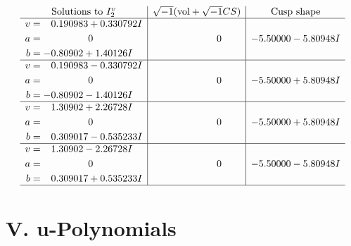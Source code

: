\documentclass[1p]{elsarticle_modified}
\theoremstyle{definition}
\newcommand{\I}{\sqrt{-1}}
\begin{document}
$$\begin{array}{c|c|c}  
\text{Solutions to }I^v_{2}& \I (\text{vol} + \sqrt{-1}CS) & \text{Cusp shape}\\
 \hline 
\begin{aligned}
v &= \phantom{-}0.190983 + 0.330792 I \\
a &= \phantom{-0.000000 } 0 \\
b &= -0.80902 + 1.40126 I\end{aligned}
 & \phantom{-0.000000 } 0 & -5.50000 - 5.80948 I \\ \hline\begin{aligned}
v &= \phantom{-}0.190983 - 0.330792 I \\
a &= \phantom{-0.000000 } 0 \\
b &= -0.80902 - 1.40126 I\end{aligned}
 & \phantom{-0.000000 } 0 & -5.50000 + 5.80948 I \\ \hline\begin{aligned}
v &= \phantom{-}1.30902 + 2.26728 I \\
a &= \phantom{-0.000000 } 0 \\
b &= \phantom{-}0.309017 - 0.535233 I\end{aligned}
 & \phantom{-0.000000 } 0 & -5.50000 + 5.80948 I \\ \hline\begin{aligned}
v &= \phantom{-}1.30902 - 2.26728 I \\
a &= \phantom{-0.000000 } 0 \\
b &= \phantom{-}0.309017 + 0.535233 I\end{aligned}
 & \phantom{-0.000000 } 0 & -5.50000 - 5.80948 I\\
 \hline 
 \end{array}$$\newpage
\newpage\renewcommand{\arraystretch}{1}
\centering \section*{ V. u-Polynomials}
\end{document}
